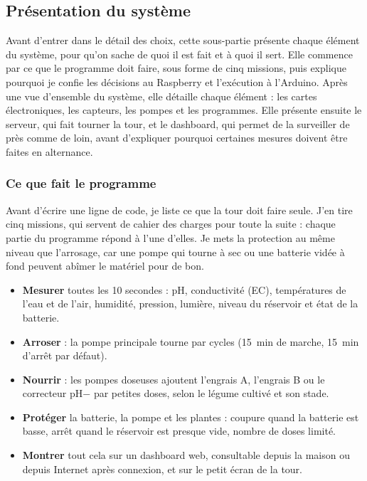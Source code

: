 
\subsection{Présentation du système}

Avant d'entrer dans le détail des choix, cette sous-partie présente chaque élément du système, pour qu'on sache de quoi il est fait et à quoi il sert. Elle commence par ce que le programme doit faire, sous forme de cinq missions, puis explique pourquoi je confie les décisions au Raspberry et l'exécution à l'Arduino. Après une vue d'ensemble du système, elle détaille chaque élément : les cartes électroniques, les capteurs, les pompes et les programmes. Elle présente ensuite le serveur, qui fait tourner la tour, et le dashboard, qui permet de la surveiller de près comme de loin, avant d'expliquer pourquoi certaines mesures doivent être faites en alternance.

\subsubsection*{Ce que fait le programme}

Avant d'écrire une ligne de code, je liste ce que la tour doit faire seule. J'en tire cinq missions, qui servent de cahier des charges pour toute la suite : chaque partie du programme répond à l'une d'elles. Je mets la protection au même niveau que l'arrosage, car une pompe qui tourne à sec ou une batterie vidée à fond peuvent abîmer le matériel pour de bon.

\begin{itemize}
\item \textbf{Mesurer} toutes les 10 secondes : pH, conductivité (EC), températures de l'eau et de l'air, humidité, pression, lumière, niveau du réservoir et état de la batterie.
\item \textbf{Arroser} : la pompe principale tourne par cycles (\qty{15}{min} de marche, \qty{15}{min} d'arrêt par défaut).
\item \textbf{Nourrir} : les pompes doseuses ajoutent l'engrais A, l'engrais B ou le correcteur pH$-$ par petites doses, selon le légume cultivé et son stade.
\item \textbf{Protéger} la batterie, la pompe et les plantes : coupure quand la batterie est basse, arrêt quand le réservoir est presque vide, nombre de doses limité.
\item \textbf{Montrer} tout cela sur un dashboard web, consultable depuis la maison ou depuis Internet après connexion, et sur le petit écran de la tour.
\end{itemize}

